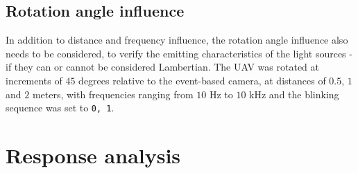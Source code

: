 \subsection{Rotation angle influence}

In addition to distance and frequency influence, the rotation angle influence also needs to be considered, to
verify the emitting characteristics of the light sources - if they can or cannot be considered Lambertian.
The \ac{UAV} was rotated at increments of $45$ degrees relative to the event-based camera, at distances of $0.5$, $1$ and $2$ meters,
with frequencies ranging from $10$ Hz to $10$ kHz and the blinking sequence was set to \texttt{0, 1}.




\section{Response analysis}

